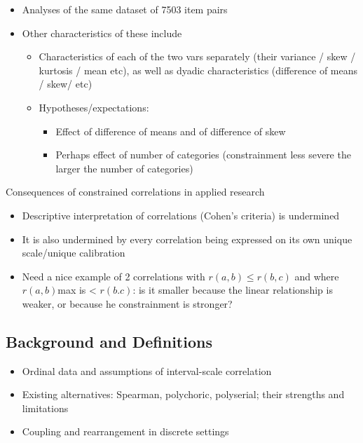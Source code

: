 \documentclass[
  12pt,
]{article}
\providecommand{\tightlist}{%
  \setlength{\itemsep}{0pt}\setlength{\parskip}{0pt}}\usepackage{longtable,booktabs,array}
\theoremstyle{plain}
\theoremstyle{definition}
\theoremstyle{remark}
\begin{document}
\begin{itemize}
\tightlist
\item
  Analyses of the same dataset of 7503 item pairs
\item
  Other characteristics of these include

  \begin{itemize}
  \tightlist
  \item
    Characteristics of each of the two vars separately (their variance /
    skew / kurtosis / mean etc), as well as dyadic characteristics
    (difference of means / skew/ etc)
  \item
    Hypotheses/expectations:

    \begin{itemize}
    \tightlist
    \item
      Effect of difference of means and of difference of skew
    \item
      Perhaps effect of number of categories (constrainment less severe
      the larger the number of categories)
    \end{itemize}
  \end{itemize}
\end{itemize}

Consequences of constrained correlations in applied research

\begin{itemize}
\tightlist
\item
  Descriptive interpretation of correlations (Cohen's criteria) is
  undermined
\item
  It is also undermined by every correlation being expressed on its own
  unique scale/unique calibration
\item
  Need a nice example of 2 correlations with \(r(a,b) \le r(b,c)\) and
  where \(r(a,b)\)max is \textless{} \(r(b.c)\): is it smaller because
  the linear relationship is weaker, or because he constrainment is
  stronger?
\end{itemize}

\subsection{Background and
Definitions}\label{background-and-definitions}

\begin{itemize}
\tightlist
\item
  Ordinal data and assumptions of interval-scale correlation\\
\item
  Existing alternatives: Spearman, polychoric, polyserial; their
  strengths and limitations\\
\item
  Coupling and rearrangement in discrete settings
\end{itemize}
\end{document}
